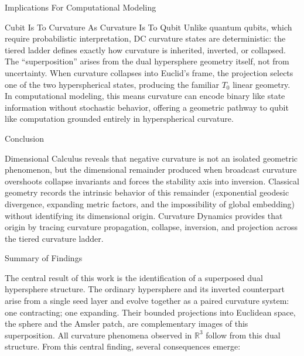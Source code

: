 \documentclass[final,onefignum,onetabnum]{siamart}
\begin{document}
\begin{section}{Implications For Computational Modeling}
\begin{subsection}{Cubit Is To Curvature As Curvature Is To Qubit}
Unlike quantum qubits, which require probabilistic interpretation, DC curvature states are deterministic: the tiered ladder defines exactly how curvature is inherited, inverted, or collapsed. The “superposition” arises from the dual hypersphere geometry itself, not from uncertainty. When curvature collapses into Euclid’s frame, the projection selects one of the two hyperspherical states, producing the familiar $T_0$ linear geometry. In computational modeling, this means curvature can encode binary like state information without stochastic behavior, offering a geometric pathway to qubit like computation grounded entirely in hyperspherical curvature.
\end{subsection}
\end{section}

\begin{section}{Conclusion}

Dimensional Calculus reveals that negative curvature is not an isolated geometric phenomenon, but the dimensional remainder produced when broadcast curvature overshoots collapse invariants and forces the stability axis into inversion. Classical geometry records the intrinsic behavior of this remainder (exponential geodesic divergence, expanding metric factors, and the impossibility of global embedding) without identifying its dimensional origin. Curvature Dynamics provides that origin by tracing curvature propagation, collapse, inversion, and projection across the tiered curvature ladder.

\begin{subsection}{Summary of Findings}

The central result of this work is the identification of a superposed dual hypersphere structure. The ordinary hypersphere and its inverted counterpart arise from a single seed layer and evolve together as a paired curvature system: one contracting; one expanding. Their bounded projections into Euclidean space, the sphere and the Amsler patch, are complementary images of this superposition. All curvature phenomena observed in $\mathbb{R}^3$ follow from this dual structure. From this central finding, several consequences emerge:


\end{subsection}
\end{section}
\end{document}
